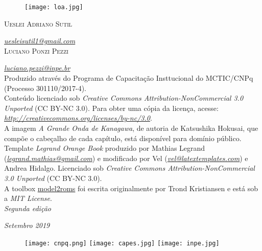 \newpage
\thispagestyle{empty}

\begin{figure}[H]
    \centering
    \vspace*{\fill}
    \texttt{[image: loa.jpg]}
    \vspace{2.7cm}
\end{figure}


\noindent \textsc{Ueslei Adriano Sutil}

\noindent \textcolor{bleu_cite}{\href{uesleisutil1@gmail.com}{\textit{uesleisutil1@gmail.com}}} \\ %

\noindent \textsc{Luciano Ponzi Pezzi}

\noindent \textcolor{bleu_cite}{\href{luciano.pezzi@inpe.br}{\textit{luciano.pezzi@inpe.br}}} \\ %

\noindent Produzido através do Programa de Capacitação Insttucional do MCTIC/CNPq (Processo 301110/2017-4). \\

\noindent Conteúdo licenciado sob \textit{Creative Commons Attribution-NonCommercial 3.0 Unported} (CC BY-NC 3.0).
          Para obter uma cópia da licença, acesse: 
          \textcolor{bleu_cite}{\href{http://creativecommons.org/licenses/by-nc/3.0}{\textit{http://creativecommons.org/licenses/by-nc/3.0}}}. \\

\noindent A imagem \textit{A Grande Onda de Kanagawa}, de autoria de Katsushika Hokusai, que compõe o cabeçalho de cada capítulo, está disponível para domínio público.\\

\noindent Template \textit{Legrand Orange Book} produzido por Mathias Legrand 
          (\textcolor{bleu_cite}{\href{legrand.mathias@gmail.com}{\textit{legrand.mathias@gmail.com}}}) e modificado por 
          Vel (\textcolor{bleu_cite}{\href{vel@latextemplates.com}{\textit{vel@latextemplates.com}}}) e Andrea Hidalgo. 
          Licenciado sob \textit{Creative Commons Attribution-NonCommercial 3.0 Unported} (CC BY-NC 3.0).\\

\noindent A toolbox \textcolor{bleu_cite}{\href{https://github.com/trondkr/model2roms}{model2roms}} foi escrita originalmente por 
          Trond Kristiansen e está sob a \textit{MIT License}. \\

\noindent \textit{Segunda edição}  %

\noindent \textit{Setembro 2019} \\ %

\begin{figure}[H]
    \centering
    \vspace*{\fill}
    \texttt{[image: cnpq.png]}
    \hspace{3cm}
    \texttt{[image: capes.jpg]}
    \hspace{3cm}    
    \texttt{[image: inpe.jpg]}
\end{figure}
